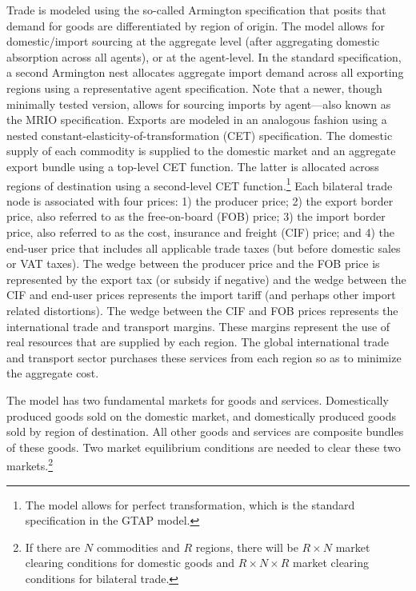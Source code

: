 \documentclass[11pt,letterpaper]{report}
\begin{document}
Trade is modeled using the so-called Armington specification that posits that
demand for goods are differentiated by region of origin. The model allows for
domestic/import sourcing at the aggregate level (after aggregating domestic
absorption across all agents), or at the agent-level. In the standard
specification, a second Armington nest allocates aggregate import demand across
all exporting regions using a representative agent specification. Note that a
newer, though minimally tested version, allows for sourcing imports by
agent---also known as the MRIO specification. Exports are modeled in an
analogous fashion using a nested constant-elasticity-of-transformation (CET)
specification. The domestic supply of each commodity is supplied to the domestic
market and an aggregate export bundle using a top-level CET function. The latter
is allocated across regions of destination using a second-level CET
function.\footnote{The model allows for perfect transformation, which is the
standard specification in the GTAP model.} Each bilateral trade node is
associated with four prices: 1) the producer price; 2) the export border price,
also referred to as the free-on-board (FOB) price; 3) the import border price,
also referred to as the cost, insurance and freight (CIF) price; and 4) the
end-user price that includes all applicable trade taxes (but before domestic
sales or VAT taxes). The wedge between the
producer price and the FOB price is represented by the export tax (or subsidy if
negative) and the wedge between the CIF and end-user prices represents the
import tariff (and perhaps other import related distortions). The wedge between
the CIF and FOB prices represents the international trade and transport margins.
These margins represent the use of real resources that are supplied by each
region. The global international trade and transport sector purchases these
services from each region so as to minimize the aggregate cost.

The model has two fundamental markets for goods and services. Domestically
produced goods sold on the domestic market, and domestically produced goods sold
by region of destination. All other goods and services are composite bundles of
these goods. Two market equilibrium conditions are needed to clear these two
markets.\footnote{If there are $N$ commodities and $R$ regions, there will be
$R \times N$ market clearing conditions for domestic goods and $R \times N
\times R$ market clearing conditions for bilateral trade.}
\end{document}
